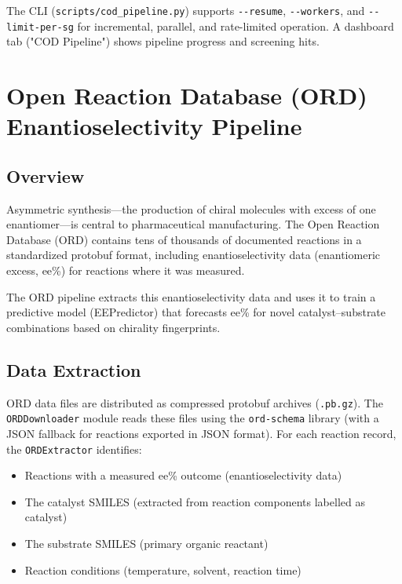 \documentclass[11pt,a4paper]{article}
\begin{document}
The CLI (\texttt{scripts/cod\_pipeline.py}) supports \texttt{-{}-resume},
\texttt{-{}-workers}, and \texttt{-{}-limit-per-sg} for incremental, parallel,
and rate-limited operation. A dashboard tab ("COD Pipeline") shows pipeline
progress and screening hits.

\newpage

\section{Open Reaction Database (ORD) Enantioselectivity Pipeline}
\label{sec:ord}

\subsection{Overview}

Asymmetric synthesis---the production of chiral molecules with excess of one
enantiomer---is central to pharmaceutical manufacturing. The Open Reaction
Database (ORD) contains tens of thousands of documented reactions in a
standardized protobuf format, including enantioselectivity data (enantiomeric
excess, ee\%) for reactions where it was measured.

The ORD pipeline extracts this enantioselectivity data and uses it to train a
predictive model (EEPredictor) that forecasts ee\% for novel catalyst--substrate
combinations based on chirality fingerprints.

\subsection{Data Extraction}

ORD data files are distributed as compressed protobuf archives (\texttt{.pb.gz}).
The \texttt{ORDDownloader} module reads these files using the \texttt{ord-schema}
library (with a JSON fallback for reactions exported in JSON format). For each
reaction record, the \texttt{ORDExtractor} identifies:

\begin{itemize}[leftmargin=1.5em]
  \item Reactions with a measured ee\% outcome (enantioselectivity data)
  \item The catalyst SMILES (extracted from reaction components labelled as catalyst)
  \item The substrate SMILES (primary organic reactant)
  \item Reaction conditions (temperature, solvent, reaction time)
\end{itemize}
\end{document}
